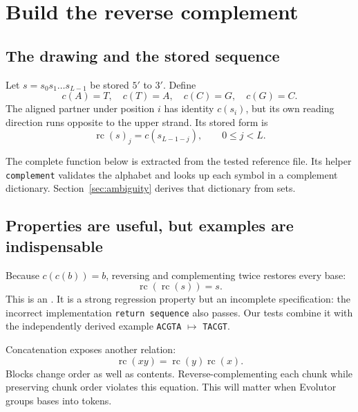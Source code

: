 \section{Build the reverse complement}

\subsection{The drawing and the stored sequence}

Let $s=s_0s_1\ldots s_{L-1}$ be stored $5'$ to $3'$. Define
\begin{equation}
c(A)=T,\quad c(T)=A,\quad c(C)=G,\quad c(G)=C.
\end{equation}
The aligned partner under position $i$ has identity $c(s_i)$, but its own
reading direction runs opposite to the upper strand. Its stored form is
\begin{equation}
\operatorname{rc}(s)_j=c(s_{L-1-j}),\qquad 0\leq j<L.
\label{eq:rc}
\end{equation}


The complete function below is extracted from the tested reference file.
Its helper \texttt{complement} validates the alphabet and looks up each
symbol in a complement dictionary. Section~\ref{sec:ambiguity} derives that
dictionary from sets.

\subsection{Properties are useful, but examples are indispensable}

Because $c(c(b))=b$, reversing and complementing twice restores every base:
\begin{equation}
\operatorname{rc}(\operatorname{rc}(s))=s.
\label{eq:involution}
\end{equation}
This is an . It is a strong regression property but an
incomplete specification: the incorrect implementation
\texttt{return sequence} also passes. Our tests combine it with the
independently derived example \texttt{ACGTA} $\mapsto$ \texttt{TACGT}.

Concatenation exposes another relation:
\begin{equation}
\operatorname{rc}(xy)=\operatorname{rc}(y)\operatorname{rc}(x).
\label{eq:concat}
\end{equation}
Blocks change order as well as contents. Reverse-complementing each chunk
while preserving chunk order violates this equation. This will matter when
Evolutor groups bases into tokens.

